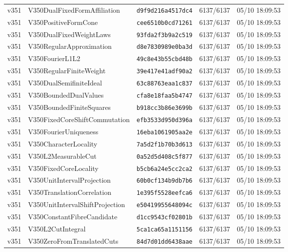 \documentclass[11pt]{article}
\theoremstyle{definition}\newtheorem{deriv}{Derivação}
\begin{document}
{\begin{longtable}{@{}lllll@{}}
v351 & V350DualFixedFormAffiliation & \texttt{d9f9d216a4517dc4} & 6137/6137 & 05/10 18:09:53 \\
v351 & V350PositiveFormCone & \texttt{cee6510b0cd71261} & 6137/6137 & 05/10 18:09:53 \\
v351 & V350DualFixedWeightLaws & \texttt{93fda2f3b9a2c519} & 6137/6137 & 05/10 18:09:53 \\
v351 & V350RegularApproximation & \texttt{d8e7830989e0ba3d} & 6137/6137 & 05/10 18:09:53 \\
v351 & V350FourierL1L2 & \texttt{49c8e43b55cbd48b} & 6137/6137 & 05/10 18:09:53 \\
v351 & V350RegularFiniteWeight & \texttt{39e417e41adf90a2} & 6137/6137 & 05/10 18:09:53 \\
v351 & V350DualSemifiniteIdeal & \texttt{63c88763eaa1c837} & 6137/6137 & 05/10 18:09:53 \\
v351 & V350BoundedDualValues & \texttt{cfa8e18faa5b4747} & 6137/6137 & 05/10 18:09:53 \\
v351 & V350BoundedFiniteSquares & \texttt{b918cc3b86e3699b} & 6137/6137 & 05/10 18:09:53 \\
v351 & V350FixedCoreShiftCommutation & \texttt{efb3533d950d396a} & 6137/6137 & 05/10 18:09:53 \\
v351 & V350FourierUniqueness & \texttt{16eba1061905aa2e} & 6137/6137 & 05/10 18:09:53 \\
v351 & V350CharacterLocality & \texttt{7a5d2f1b70b3d613} & 6137/6137 & 05/10 18:09:53 \\
v351 & V350L2MeasurableCut & \texttt{0a52d5d408c5f877} & 6137/6137 & 05/10 18:09:53 \\
v351 & V350FixedCoreLocality & \texttt{b5cb6a24e5cc2ca2} & 6137/6137 & 05/10 18:09:53 \\
v351 & V350UnitIntervalProjection & \texttt{60b0cf134b9db7b6} & 6137/6137 & 05/10 18:09:53 \\
v351 & V350TranslationCorrelation & \texttt{1e395f5528eefca6} & 6137/6137 & 05/10 18:09:53 \\
v351 & V350UnitIntervalShiftProjection & \texttt{e50419955648094c} & 6137/6137 & 05/10 18:09:53 \\
v351 & V350ConstantFibreCandidate & \texttt{d1cc9543cf02801b} & 6137/6137 & 05/10 18:09:53 \\
v351 & V350L2CutIntegral & \texttt{5ca1ca65a1151156} & 6137/6137 & 05/10 18:09:53 \\
v351 & V350ZeroFromTranslatedCuts & \texttt{84d7d01dd6438aae} & 6137/6137 & 05/10 18:09:53 \\

\end{longtable}}
\end{document}
